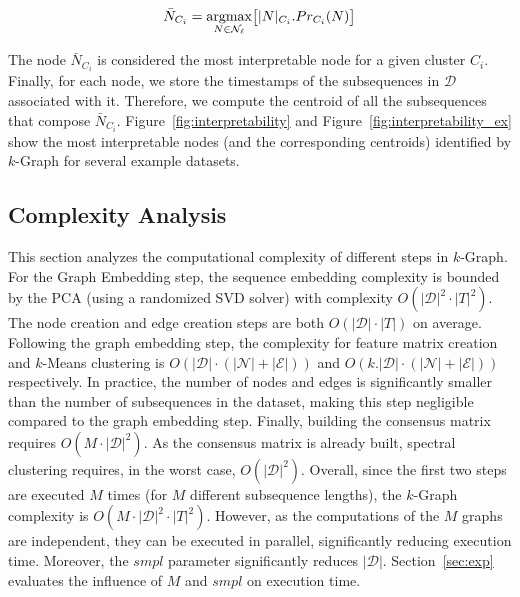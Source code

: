\begin{equation}
\small{
    \bar{N}_{C_i} = \underset{N \in \mathcal{N}_\ell}{\operatorname{argmax}} \big[|N|_{C_i}.Pr_{C_i}(N)\big]
}
\end{equation}

The node $\bar{N}_{C_i}$ is considered the most interpretable node for a given cluster $C_i$. Finally, for each node, we store the timestamps of the subsequences in $\mathcal{D}$ associated with it. Therefore, we compute the centroid of all the subsequences that compose $\bar{N}_{C_i}$. Figure~\ref{fig:interpretability} and Figure~\ref{fig:interpretability_ex} show the most interpretable nodes (and the corresponding centroids) identified by $k$-Graph for several example datasets.



\subsection{Complexity Analysis}
\label{sol:complexity}

This section analyzes the computational complexity of different steps in $k$-Graph. 
For the Graph Embedding step, the sequence embedding complexity is bounded by the PCA (using a randomized SVD solver) with complexity $O(|\mathcal{D}|^2\cdot|T|^2)$. 
The node creation and edge creation steps are both $O(|\mathcal{D}|\cdot|T|)$ on average.
Following the graph embedding step, the complexity for feature matrix creation and $k$-Means clustering is $O(|\mathcal{D}|\cdot(|\mathcal{N}|+|\mathcal{E}|))$ and $O(k.|\mathcal{D}|\cdot(|\mathcal{N}|+|\mathcal{E}|))$ respectively. In practice, the number of nodes and edges is significantly smaller than the number of subsequences in the dataset, making this step negligible compared to the graph embedding step. 
Finally, building the consensus matrix requires $O(M\cdot|\mathcal{D}|^2)$. 
As the consensus matrix is already built, spectral clustering requires, in the worst case, $O(|\mathcal{D}|^2)$. 
Overall, since the first two steps are executed $M$ times (for $M$ different subsequence lengths), the $k$-Graph complexity is $O(M\cdot|\mathcal{D}|^2\cdot|T|^2)$. 
However, as the computations of the $M$ graphs are independent, they can be executed in parallel, significantly reducing execution time. 
Moreover, the $smpl$ parameter significantly reduces $|\mathcal{D}|$. 
Section~\ref{sec:exp} evaluates the influence of $M$ and $smpl$ on execution time.